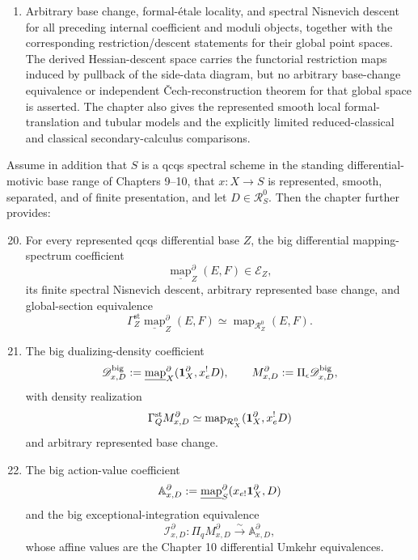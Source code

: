 \begin{theorem}
\begin{enumerate}
\item Arbitrary base change, formal-\'etale locality, and spectral Nisnevich descent for all preceding internal coefficient and moduli objects, together with the corresponding restriction/descent statements for their global point spaces. The derived Hessian-descent space carries the functorial restriction maps induced by pullback of the side-data diagram, but no arbitrary base-change equivalence or independent Čech-reconstruction theorem for that global space is asserted. The chapter also gives the represented smooth local formal-translation and tubular models and the explicitly limited reduced-classical and classical secondary-calculus comparisons.
\end{enumerate}

Assume in addition that \(S\) is a qcqs spectral scheme in the standing differential-motivic base range of Chapters 9--10, that \(x:X\to S\) is represented, smooth, separated, and of finite presentation, and let \(D\in\mathcal R_S^0\). Then the chapter further provides:

\begin{enumerate}
\setcounter{enumi}{19}
\item For every represented qcqs differential base \(Z\), the big differential mapping-spectrum coefficient
\[
    \underline{\operatorname{map}}_Z^\partial(E,F)\in\mathcal E_Z,
\]
its finite spectral Nisnevich descent, arbitrary represented base change, and global-section equivalence
\[
    \Gamma_Z^{\mathrm{st}}
    \underline{\operatorname{map}}_Z^\partial(E,F)
    \simeq
    \operatorname{map}_{\mathcal R_Z^0}(E,F).
\]

\item The big dualizing-density coefficient
\[
    \mathscr D_{x,D}^{\mathrm{big}}
    :=
    \underline{\operatorname{map}}_X^\partial
    (\mathbf 1_X^\partial,x_e^!D),
    \qquad
    M^\partial_{x,D}
    :=
    \Pi_\epsilon\mathscr D_{x,D}^{\mathrm{big}},
\]
with density realization
\[
    \Gamma_Q^{\mathrm{st}}M^\partial_{x,D}
    \simeq
    \operatorname{map}_{\mathcal R_X^0}
    (\mathbf 1_X^\partial,x_e^!D)
\]
and arbitrary represented base change.

\item The big action-value coefficient
\[
    \mathbb A^\partial_{x,D}
    :=
    \underline{\operatorname{map}}_S^\partial
    (x_{e!}\mathbf 1_X^\partial,D)
\]
and the big exceptional-integration equivalence
\[
    \boxed{
    \mathcal I^\partial_{x,D}:
    \Pi_qM^\partial_{x,D}
    \xrightarrow{\sim}
    \mathbb A^\partial_{x,D},
    }
\]
whose affine values are the Chapter 10 differential Umkehr equivalences.


\end{enumerate}
\end{theorem}
